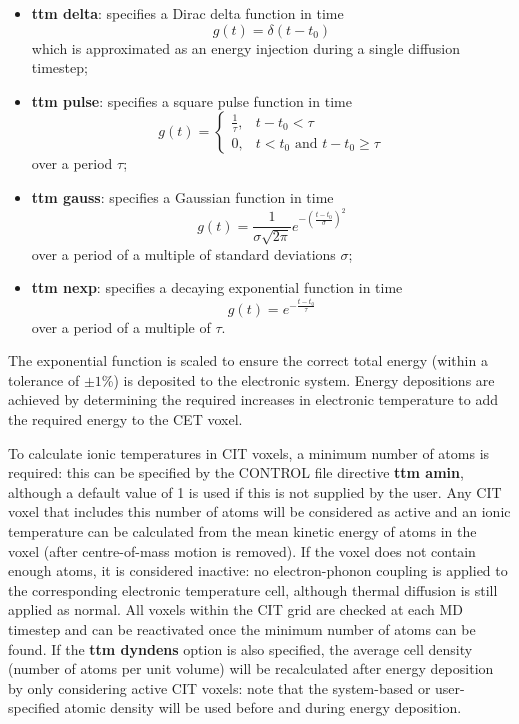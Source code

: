 \begin{itemize}
\item {\bf ttm delta}: specifies a Dirac delta function in time \begin{equation*} g(t) = \delta (t - t_0) \end{equation*} which is approximated as an energy injection during a single diffusion timestep;
\item {\bf ttm pulse}: specifies a square pulse function in time \begin{equation*} g(t) = \left\{\begin{array}{lr} \frac{1}{\tau}, & t - t_0 < \tau\\ 0, & t<t_0 \text{ and } t - t_0 \ge \tau \end{array} \right. \end{equation*} over a period $\tau$;
\item {\bf ttm gauss}: specifies a Gaussian function in time \begin{equation*} g(t) = \frac{1}{\sigma\sqrt{2\pi}}e^{-\left(\frac{t-t_0}{\sigma}\right)^2} \end{equation*} over a period of a multiple of standard deviations $\sigma$;
\item {\bf ttm nexp}: specifies a decaying exponential function in time \begin{equation*} g(t) = e^{-\frac{t-t_0}{\tau}} \end{equation*} over a period of a multiple of $\tau$.
\end{itemize}
The exponential function is scaled to ensure the correct total energy
(within a tolerance of $\pm 1$\%) is deposited to the electronic system.
Energy depositions are achieved by determining the required increases
in electronic temperature to add the required energy to the CET voxel.

To calculate ionic temperatures in CIT voxels, a minimum number of
atoms is required: this can be specified by the CONTROL file directive
{\bf ttm amin}, although a default value of 1 is used if this is not supplied
by the user. Any CIT voxel that includes this number of atoms will be
considered as active and an ionic temperature can be calculated from
the mean kinetic energy of atoms in the voxel (after centre-of-mass
motion is removed). If the voxel does not contain enough atoms, it is
considered inactive: no electron-phonon coupling is applied to the
corresponding electronic temperature cell, although thermal diffusion is
still applied as normal. All voxels within the CIT grid are checked
at each MD timestep and can be reactivated once the minimum number
of atoms can be found. If the {\bf ttm dyndens} option is also specified,
the average cell density (number of atoms per unit volume) will be
recalculated after energy deposition by only considering active CIT
voxels: note that the system-based or user-specified atomic density
will be used before and during energy deposition.

